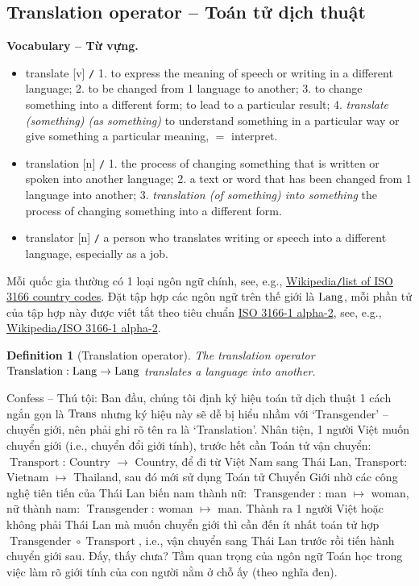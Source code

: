 \documentclass[12pt,oneside]{book}
\newtheorem{definition}{Definition}[section]
\begin{document}
\subsection{Translation operator -- Toán tử dịch thuật}
\textbf{\textsf{\small Vocabulary -- Từ vựng.}}
\begin{itemize}\small
	\item {\sf translate} [v] {\tt/} 1. to express the meaning of speech or writing in a different language; 2. to be changed from 1 language to another; 3. to change something into a different form; to lead to a particular result; 4. {\it translate (something) (as something)} to understand something in a particular way or give something a particular meaning, $=$ {\sf interpret}.
	\item {\sf translation} [n] {\tt/} 1. the process of changing something that is written or spoken into another language; 2. a text or word that has been changed from 1 language into another; 3. {\it translation (of something) into something} the process of changing something into a different form.
	\item {\sf translator} [n] {\tt/} a person who translates writing or speech into a different language, especially as a job.
\end{itemize}
Mỗi quốc gia thường có 1 loại ngôn ngữ chính, see, e.g., \href{https://en.wikipedia.org/wiki/List_of_ISO_3166_country_codes}{Wikipedia{\tt/}list of ISO 3166 country codes}. Đặt tập hợp các ngôn ngữ trên thế giới là ${\rm Lang}$, mỗi phần tử của tập hợp này được viết tắt theo tiêu chuẩn \href{https://en.wikipedia.org/wiki/ISO_3166-1_alpha-2}{ISO 3166-1 alpha-2}, see, e.g., \href{https://en.wikipedia.org/wiki/ISO_3166-1_alpha-2}{Wikipedia{\tt/}ISO 3166-1 alpha-2}.

\begin{definition}[Translation operator]
	The \emph{translation operator} $\operatorname{Translation}:{\rm Lang}\to{\rm Lang}$ translates a language into another.
\end{definition}
{\sf Confess -- Thú tội}: Ban đầu, chúng tôi định ký hiệu toán tử dịch thuật 1 cách ngắn gọn là ${\rm Trans}$ nhưng ký hiệu này sẽ dễ bị hiểu nhầm với `Transgender' -- chuyển giới, nên phải ghi rõ tên ra là `Translation'. Nhân tiện, 1 người Việt muốn chuyển giới (i.e., chuyển đổi giới tính), trước hết cần Toán tử vận chuyển: $\operatorname{Transport}$: Country $\to$ Country, để đi từ Việt Nam sang Thái Lan, Transport: Vietnam $\mapsto$ Thailand, sau đó mới sử dụng Toán tử Chuyển Giới nhờ các công nghệ tiên tiến của Thái Lan biến nam thành nữ: $\operatorname{Transgender}$: man $\mapsto$ woman, nữ thành nam: $\operatorname{Transgender}$: woman $\mapsto$ man. Thành ra 1 người Việt hoặc không phải Thái Lan mà muốn chuyển giới thì cần đến ít nhất toán tử hợp $\operatorname{Transgender}\circ\operatorname{Transport}$, i.e., vận chuyển sang Thái Lan trước rồi tiến hành chuyển giới sau. Đấy, thấy chưa? Tầm quan trọng của ngôn ngữ Toán học trong việc làm rõ giới tính của con người nằm ở chỗ ấy (theo nghĩa đen).
\end{document}
